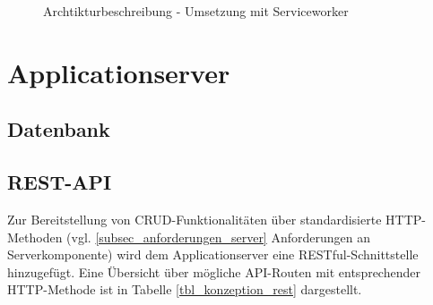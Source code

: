 \begin{figure}[htp] 
\caption{Archtikturbeschreibung - Umsetzung mit Serviceworker}
\label{image_architektur-serviceworker-push}
\end{figure} 

\newpage
\section{Applicationserver}
\label{sec_konzeption_applicationserver}

\subsection{Datenbank}



\subsection{REST-API}

Zur Bereitstellung von CRUD-Funktionalitäten über standardisierte HTTP-Methoden (vgl. \ref{subsec_anforderungen_server} Anforderungen an Serverkomponente) wird dem Applicationserver eine RESTful-Schnittstelle hinzugefügt. Eine Übersicht über mögliche API-Routen mit entsprechender HTTP-Methode ist in Tabelle \ref{tbl_konzeption_rest} dargestellt. \\

